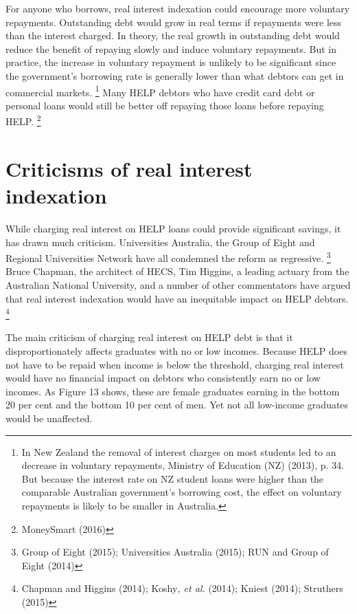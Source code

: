 \documentclass[embargoed]{grattan}
\begin{document}
For anyone who borrows, real interest indexation could encourage more voluntary repayments.
Outstanding debt would grow in real terms if repayments were less than the interest charged.
In theory, the real growth in outstanding debt would reduce the benefit of repaying slowly and induce voluntary repayments.
But in practice, the increase in voluntary repayment is unlikely to be significant since the government's borrowing rate is generally lower than what debtors can get in commercial markets.%
\footnote{In New Zealand the removal of interest charges on most students led to an decrease in voluntary repayments, Ministry of Education (NZ) (2013), p. 34.
But because the interest rate on NZ student loans were higher than the comparable Australian government's borrowing cost, the effect on voluntary repayments is likely to be smaller in Australia.} Many HELP debtors who have credit card debt or personal loans would still be better off repaying those loans before repaying HELP.%
\footnote{MoneySmart (2016)}

\section{\texorpdfstring{\protect\hypertarget{_Ref438047461}{}{\protect\hypertarget{_Ref333580055}{}{}}Criticisms of real interest indexation}{Criticisms of real interest indexation}}\label{criticisms-of-real-interest-indexation}

While charging real interest on HELP loans could provide significant savings, it has drawn much criticism.
Universities Australia, the Group of Eight and Regional Universities Network have all condemned the reform as regressive.%
\footnote{Group of Eight (2015); Universities Australia (2015); RUN and Group of Eight (2014)} Bruce Chapman, the architect of HECS, Tim Higgins, a leading actuary from the Australian National University, and a number of other commentators have argued that real interest indexation would have an inequitable impact on HELP debtors.%
\footnote{Chapman and Higgins (2014); Koshy\emph{, et al.} (2014); Kniest (2014); Struthers (2015)}

The main criticism of charging real interest on HELP debt is that it disproportionately affects graduates with no or low incomes.
Because HELP does not have to be repaid when income is below the threshold, charging real interest would have no financial impact on debtors who consistently earn no or low incomes.
As Figure 13 shows, these are female graduates earning in the bottom 20 per cent and the bottom 10 per cent of men.
Yet not all low-income graduates would be unaffected.
\end{document}
